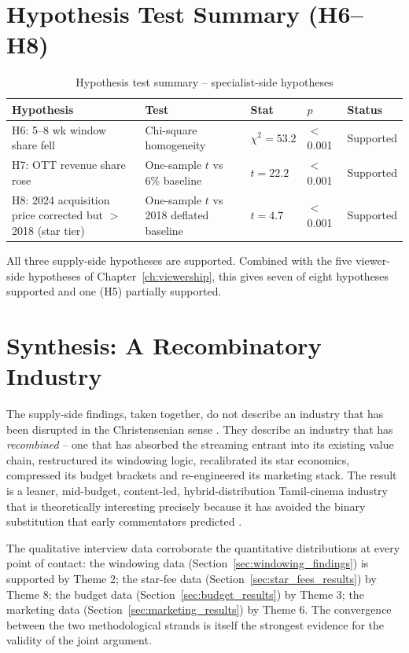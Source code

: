 \section{Hypothesis Test Summary (H6--H8)}
\label{sec:hyp_summary_6}

\begin{table}[h]
\centering
\caption{Hypothesis test summary -- specialist-side hypotheses}
\label{tab:hyp_6}
\small
\begin{tabular}{p{4.0cm} p{4.0cm} p{2.4cm} p{2.0cm} p{1.5cm}}
\toprule
\textbf{Hypothesis} & \textbf{Test} & \textbf{Stat} & \textbf{$p$} & \textbf{Status}\\
\midrule
H6: 5--8 wk window share fell & Chi-square homogeneity &
$\chi^2 = 53.2$ & $<$0.001 & Supported \\
H7: OTT revenue share rose    & One-sample $t$ vs 6\% baseline & $t = 22.2$ & $<$0.001 & Supported \\
H8: 2024 acquisition price corrected but $>$ 2018 (star tier) & One-sample $t$ vs 2018 deflated baseline & $t = 4.7$ & $<$0.001 & Supported \\
\bottomrule
\end{tabular}
\end{table}

All three supply-side hypotheses are supported.  Combined with the
five viewer-side hypotheses of Chapter~\ref{ch:viewership}, this
gives seven of eight hypotheses supported and one (H5) partially
supported.

\section{Synthesis: A Recombinatory Industry}
\label{sec:synthesis_6}

The supply-side findings, taken together, do not describe an industry
that has been disrupted in the Christensenian sense
\citep{christensen1997}.  They describe an industry that has
\emph{recombined} -- one that has absorbed the streaming entrant into
its existing value chain, restructured its windowing logic,
recalibrated its star economics, compressed its budget brackets and
re-engineered its marketing stack.  The result is a leaner,
mid-budget, content-led, hybrid-distribution Tamil-cinema industry
that is theoretically interesting precisely because it has avoided
the binary substitution that early commentators predicted
\citep{wayne2018,fagerjord2018}.

The qualitative interview data corroborate the quantitative
distributions at every point of contact: the windowing data
(Section~\ref{sec:windowing_findings}) is supported by Theme 2; the
star-fee data (Section~\ref{sec:star_fees_results}) by Theme 8;
the budget data (Section~\ref{sec:budget_results}) by Theme 3; the
marketing data (Section~\ref{sec:marketing_results}) by Theme 6.
The convergence between the two methodological strands is itself
the strongest evidence for the validity of the joint argument.

